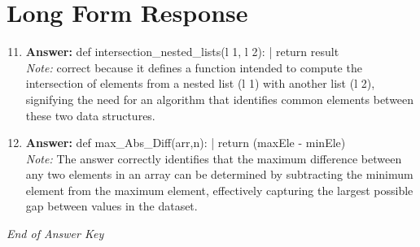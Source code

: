\documentclass[12pt]{article}
\begin{document}
\section*{Long Form Response}
\begin{enumerate}[label=\arabic*.]
\setcounter{enumi}{10}
\item \textbf{Answer:} def intersection\_nested\_lists(l 1, l 2): | return result
\\ \textit{Note:} correct because it defines a function intended to compute the intersection of elements from a nested list (l 1) with another list (l 2), signifying the need for an algorithm that identifies common elements between these two data structures.
\item \textbf{Answer:} def max\_Abs\_Diff(arr,n): | return (maxEle - minEle)
\\ \textit{Note:} The answer correctly identifies that the maximum difference between any two elements in an array can be determined by subtracting the minimum element from the maximum element, effectively capturing the largest possible gap between values in the dataset.
\end{enumerate}

\vfill
\noindent\textit{End of Answer Key}
\end{document}

